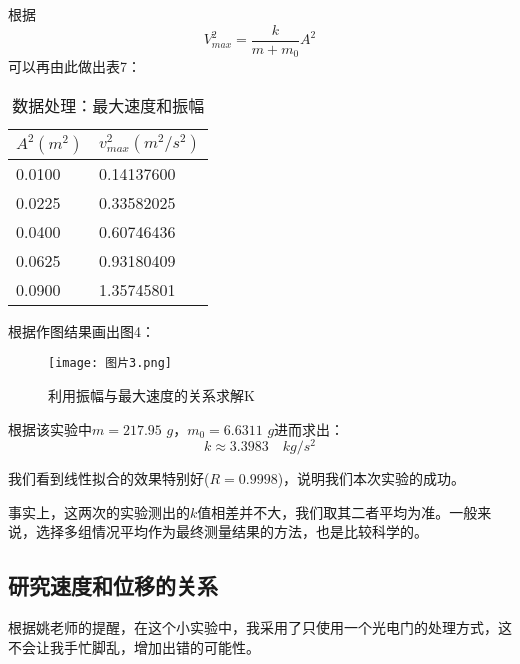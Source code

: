 \documentclass[11pt]{article}
\begin{document}
根据\begin{displaymath}V_{max}^2=\frac{k}{m+m_0}A^2\end{displaymath}可以再由此做出表7：

\begin{table}[htbp]
    \centering
    \begin{tabular}{|l|l|}
    \hline
    $A^2(m^2)$ & $v^2_{max}(m^2/s^2)$ \\ \hline
    0.0100                                       & 0.14137600                                                                 \\ \hline
    0.0225                                     & 0.33582025                                                               \\ \hline
    0.0400                                      & 0.60746436                                                               \\ \hline
    0.0625                                     & 0.93180409                                                               \\ \hline
    0.0900                                       & 1.35745801                                                               \\ \hline
    \end{tabular}
    \caption{数据处理：最大速度和振幅}
\end{table}

根据作图结果画出图4：

\begin{figure}[htbp]
    \centering
    \texttt{[image: 图片3.png]}
    \caption{利用振幅与最大速度的关系求解K}
\end{figure}

根据该实验中$m=217.95\,\, g$，$m_0=6.6311\,\, g$进而求出：
\[k\approx 3.3983\quad kg/s^2\]

我们看到线性拟合的效果特别好($R=0.9998$)，说明我们本次实验的成功。

事实上，这两次的实验测出的$k$值相差并不大，我们取其二者平均为准。一般来说，选择多组情况平均作为最终测量结果的方法，也是比较科学的。

\subsection{研究速度和位移的关系}

根据姚老师的提醒，在这个小实验中，我采用了只使用一个光电门的处理方式，这不会让我手忙脚乱，增加出错的可能性。
\end{document}
